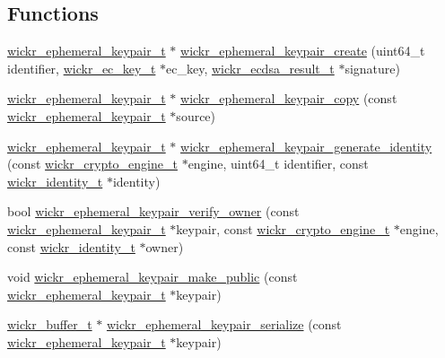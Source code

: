 \subsection*{Functions}
\begin{DoxyCompactItemize}
\item 
\mbox{\hyperlink{structwickr__ephemeral__keypair}{wickr\+\_\+ephemeral\+\_\+keypair\+\_\+t}} $\ast$ \mbox{\hyperlink{group__wickr__ephemeral__keypair_gab956214203938b4b02b8f30666eaec3b}{wickr\+\_\+ephemeral\+\_\+keypair\+\_\+create}} (uint64\+\_\+t identifier, \mbox{\hyperlink{structwickr__ec__key}{wickr\+\_\+ec\+\_\+key\+\_\+t}} $\ast$ec\+\_\+key, \mbox{\hyperlink{structwickr__ecdsa__result}{wickr\+\_\+ecdsa\+\_\+result\+\_\+t}} $\ast$signature)
\item 
\mbox{\hyperlink{structwickr__ephemeral__keypair}{wickr\+\_\+ephemeral\+\_\+keypair\+\_\+t}} $\ast$ \mbox{\hyperlink{group__wickr__ephemeral__keypair_gacf14f050221091093b9a2948bd569662}{wickr\+\_\+ephemeral\+\_\+keypair\+\_\+copy}} (const \mbox{\hyperlink{structwickr__ephemeral__keypair}{wickr\+\_\+ephemeral\+\_\+keypair\+\_\+t}} $\ast$source)
\item 
\mbox{\hyperlink{structwickr__ephemeral__keypair}{wickr\+\_\+ephemeral\+\_\+keypair\+\_\+t}} $\ast$ \mbox{\hyperlink{group__wickr__ephemeral__keypair_ga6c0935c579e3d4bdbfeada7cb60c2a1b}{wickr\+\_\+ephemeral\+\_\+keypair\+\_\+generate\+\_\+identity}} (const \mbox{\hyperlink{structwickr__crypto__engine}{wickr\+\_\+crypto\+\_\+engine\+\_\+t}} $\ast$engine, uint64\+\_\+t identifier, const \mbox{\hyperlink{structwickr__identity}{wickr\+\_\+identity\+\_\+t}} $\ast$identity)
\item 
bool \mbox{\hyperlink{group__wickr__ephemeral__keypair_gadc17110d4c7fa65a9456fae516bf2e5d}{wickr\+\_\+ephemeral\+\_\+keypair\+\_\+verify\+\_\+owner}} (const \mbox{\hyperlink{structwickr__ephemeral__keypair}{wickr\+\_\+ephemeral\+\_\+keypair\+\_\+t}} $\ast$keypair, const \mbox{\hyperlink{structwickr__crypto__engine}{wickr\+\_\+crypto\+\_\+engine\+\_\+t}} $\ast$engine, const \mbox{\hyperlink{structwickr__identity}{wickr\+\_\+identity\+\_\+t}} $\ast$owner)
\item 
void \mbox{\hyperlink{group__wickr__ephemeral__keypair_ga2e2f8db184aa2972ef5423e9c03988e8}{wickr\+\_\+ephemeral\+\_\+keypair\+\_\+make\+\_\+public}} (const \mbox{\hyperlink{structwickr__ephemeral__keypair}{wickr\+\_\+ephemeral\+\_\+keypair\+\_\+t}} $\ast$keypair)
\item 
\mbox{\hyperlink{structwickr__buffer}{wickr\+\_\+buffer\+\_\+t}} $\ast$ \mbox{\hyperlink{group__wickr__ephemeral__keypair_ga1c994a08f270cc84088263d48a4b3636}{wickr\+\_\+ephemeral\+\_\+keypair\+\_\+serialize}} (const \mbox{\hyperlink{structwickr__ephemeral__keypair}{wickr\+\_\+ephemeral\+\_\+keypair\+\_\+t}} $\ast$keypair)

\end{DoxyCompactItemize}
